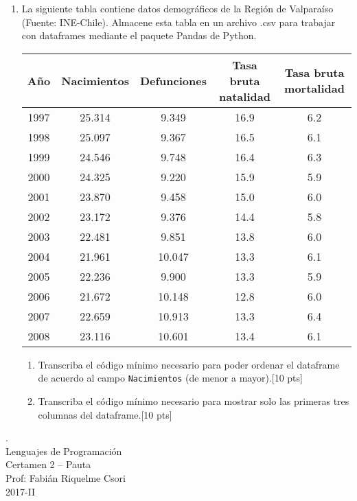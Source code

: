 \documentclass[letter,12pt,oneside]{book}
\theoremstyle{definition}
\begin{document}
\begin{enumerate}
\item La siguiente tabla contiene datos demográficos de la Región de Valparaíso (Fuente: INE-Chile). Almacene esta tabla en un archivo .csv para trabajar con dataframes mediante el paquete Pandas de Python.

\begin{center}
\begin{tabular}{|c|c|c|c|c|}\hline
    Año	& Nacimientos & Defunciones & Tasa bruta natalidad & Tasa bruta mortalidad\\\hline
    1997 & 25.314 & 9.349  & 16.9 & 6.2\\
    1998 & 25.097 & 9.367  & 16.5 & 6.1\\
    1999 & 24.546 & 9.748  & 16.4 & 6.3\\
    2000 & 24.325 & 9.220  & 15.9 & 5.9\\
    2001 & 23.870 & 9.458  & 15.0 & 6.0\\
    2002 & 23.172 & 9.376  & 14.4 & 5.8\\
    2003 & 22.481 & 9.851  & 13.8 & 6.0\\
    2004 & 21.961 & 10.047 & 13.3 & 6.1\\
    2005 & 22.236 & 9.900  & 13.3 & 5.9\\
    2006 & 21.672 & 10.148 & 12.8 & 6.0\\
    2007 & 22.659 & 10.913 & 13.3 & 6.4\\
    2008 & 23.116 & 10.601 & 13.4 & 6.1\\\hline
\end{tabular}
\end{center}

    \begin{enumerate}
    \item Transcriba el código mínimo necesario para poder ordenar el dataframe de acuerdo al campo \texttt{Nacimientos} (de menor a mayor).\tabto{75ex}[10 pts]
    \item Transcriba el código mínimo necesario para mostrar solo las primeras tres columnas del dataframe.\tabto{75ex}[10 pts]
    \end{enumerate}
\end{enumerate}


\newpage

\begin{center}
 {\Large
  {\color{white}.}\\[5ex]
  Lenguajes de Programación\\[1ex]
  Certamen 2 -- Pauta}\\[1.2ex]
  Prof: Fabián Riquelme Csori\\
  2017-II
\end{center}
\end{document}
